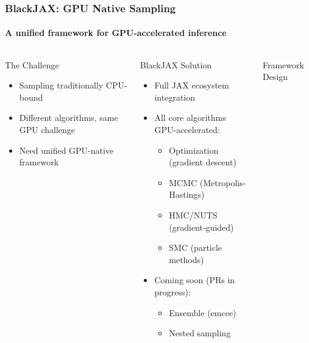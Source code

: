 \documentclass[aspectratio=169]{beamer}
\begin{document}
\begin{frame}
    \frametitle{BlackJAX: GPU Native Sampling}
    \framesubtitle{A unified framework for GPU-accelerated inference}
    \begin{columns}
        \begin{block}{The Challenge}
            \begin{itemize}
                \item Sampling traditionally CPU-bound
                \item Different algorithms, same GPU challenge
                \item Need unified GPU-native framework
            \end{itemize}
        \end{block}
        \begin{block}{BlackJAX Solution}
            \begin{itemize}
                \item Full JAX ecosystem integration
                \item All core algorithms GPU-accelerated:
                    \begin{itemize}
                        \item Optimization (gradient descent)
                        \item MCMC (Metropolis-Hastings)
                        \item HMC/NUTS (gradient-guided)
                        \item SMC (particle methods)
                    \end{itemize}
                \item Coming soon (PRs in progress):
                    \begin{itemize}
                        \item Ensemble (emcee) 
                        \item Nested sampling 
                    \end{itemize}
            \end{itemize}
        \end{block}
        \begin{block}{Framework Design}
            \begin{itemize}

\end{itemize}
\end{block}
\end{columns}
\end{frame}
\end{document}
